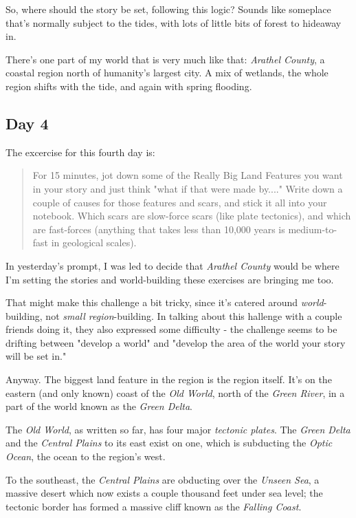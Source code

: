 \documentclass[11pt]{article}
\begin{document}
So, where should the story be set, following this logic? Sounds like
someplace that's normally subject to the tides, with lots of little
bits of forest to hideaway in.

There's one part of my world that is very much like that: \emph{Arathel
County}, a coastal region north of humanity's largest city. A mix of
wetlands, the whole region shifts with the tide, and again with spring
flooding.

\subsection*{Day 4}
\label{sec:org0e755d3}
The excercise for this fourth day is:

\begin{quote}
For 15 minutes, jot down some of the Really Big Land Features you want
in your story and just think "what if that were made by...." Write
down a couple of causes for those features and scars, and stick it all
into your notebook. Which scars are slow-force scars (like plate
tectonics), and which are fast-forces (anything that takes less than
10,000 years is medium-to-fast in geological scales).
\end{quote}

In yesterday's prompt, I was led to decide that \emph{Arathel County} would
be where I'm setting the stories and world-building these exercises
are bringing me too.

That might make this challenge a bit tricky, since it's catered around
\emph{world}-building, not \emph{small region}-building. In talking about this
hallenge with a couple friends doing it, they also expressed some
difficulty - the challenge seems to be drifting between "develop a
world" and "develop the area of the world your story will be set in."

Anyway. The biggest land feature in the region is the region itself.
It's on the eastern (and only known) coast of the \emph{Old World}, north
of the \emph{Green River}, in a part of the world known as the \emph{Green
Delta}.

The \emph{Old World}, as written so far, has four major \emph{tectonic plates}.
The \emph{Green Delta} and the \emph{Central Plains} to its east exist on one,
which is subducting the \emph{Optic Ocean}, the ocean to the region's
west.

To the southeast, the \emph{Central Plains} are obducting over the \emph{Unseen
Sea}, a massive desert which now exists a couple thousand feet under
sea level; the tectonic border has formed a massive cliff known as the
\emph{Falling Coast}.
\end{document}
